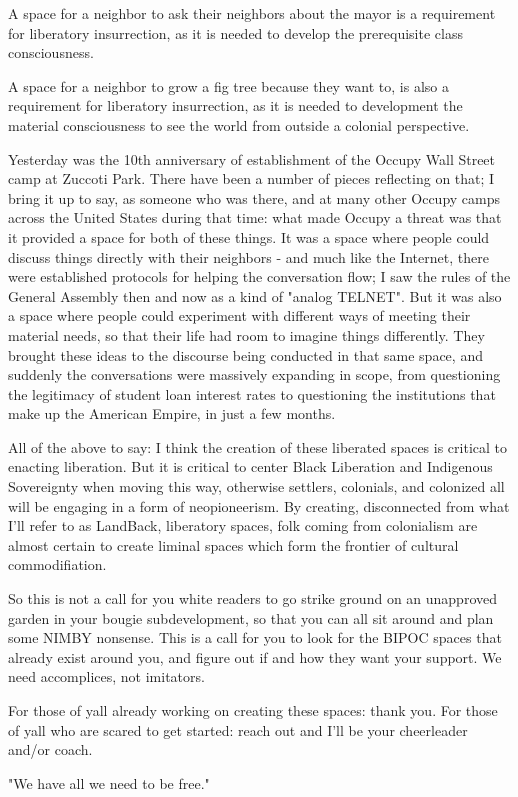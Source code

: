 \documentclass[11pt]{article}
\begin{document}
\begin{itemize}
A space for a neighbor to ask their neighbors about the mayor is a requirement for liberatory insurrection, as it is needed to develop the prerequisite class consciousness.

A space for a neighbor to grow a fig tree because they want to, is also a requirement for liberatory insurrection, as it is needed to development the material consciousness to see the world from outside a colonial perspective.

Yesterday was the 10th anniversary of establishment of the Occupy Wall Street camp at Zuccoti Park. There have been a number of pieces reflecting on that; I bring it up to say, as someone who was there, and at many other Occupy camps across the United States during that time: what made Occupy a threat was that it provided a space for both of these things. It was a space where people could discuss things directly with their neighbors - and much like the Internet, there were established protocols for helping the conversation flow; I saw the rules of the General Assembly then and now as a kind of "analog TELNET". But it was also a space where people could experiment with different ways of meeting their material needs, so that their life had room to imagine things differently. They brought these ideas to the discourse being conducted in that same space, and suddenly the conversations were massively expanding in scope, from questioning the legitimacy of student loan interest rates to questioning the institutions that make up the American Empire, in just a few months.

All of the above to say: I think the creation of these liberated spaces is critical to enacting liberation. But it is critical to center Black Liberation and Indigenous Sovereignty when moving this way, otherwise settlers, colonials, and colonized all will be engaging in a form of neopioneerism. By creating, disconnected from what I'll refer to as LandBack, liberatory spaces, folk coming from colonialism are almost certain to create liminal spaces which form the frontier of cultural commodifiation.

So this is not a call for you white readers to go strike ground on an unapproved garden in your bougie subdevelopment, so that you can all sit around and plan some NIMBY nonsense. This is a call for you to look for the BIPOC spaces that already exist around you, and figure out if and how they want your support. We need accomplices, not imitators.

For those of yall already working on creating these spaces: thank you. For those of yall who are scared to get started: reach out and I'll be your cheerleader and/or coach.

"We have all we need to be free."
\end{itemize}
\stopcontents[level-4]
\end{document}
